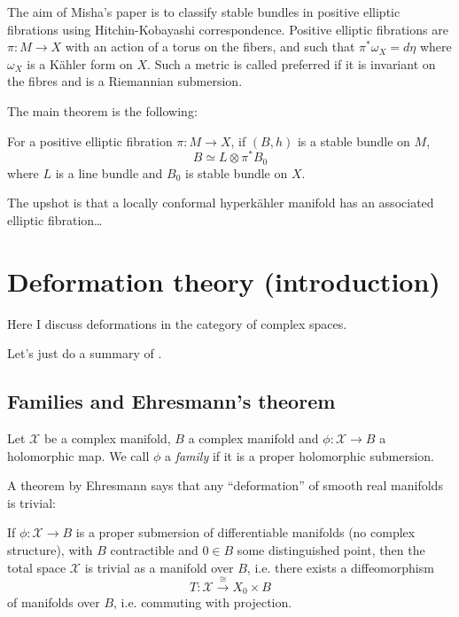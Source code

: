 \noindent
The aim of Misha's paper is to
classify stable bundles in positive elliptic
fibrations using Hitchin-Kobayashi
correspondence. Positive elliptic fibrations
are $\pi:M \to X$ with an action of a torus
on the fibers, and such that
$\pi^*\omega_X=d\eta$ where $\omega_X$ is a
Kähler form on $X$. Such a metric is called
preferred if it is invariant on the fibres
and is a Riemannian submersion.

The main theorem is the following:

\begin{theorem}
\label{theorem-stability-misha}
For a positive elliptic fibration $\pi:M \to
X$,
if $(B,h)$ is a stable bundle on $M$,
$$
B \simeq L \otimes \pi^*B_0
$$
where $L$ is a line bundle and
$B_0$ is stable bundle on $X$.
\end{theorem}

\noindent
The upshot is that a locally conformal
hyperkähler manifold
has an associated elliptic fibration…


\section{Deformation theory (introduction)}
\label{section-deformations}

\noindent
Here I discuss deformations in the category
of complex spaces.

Let's just do a summary of \cite[Chapter
9]{Voisin}.

\subsection{Families and Ehresmann's theorem}
\label{subsection-ehresmann}

Let $\mathcal{X}$ be a complex manifold, $B$
a complex manifold
and $\phi:\mathcal{X} \to B$ a holomorphic
map.
We call $\phi$ a {\it family} if it is a
proper holomorphic submersion.

A theorem by Ehresmann says that any
``deformation'' of
smooth real manifolds is trivial:

\begin{theorem}[Ehresmann]
\label{theorem-ehresmann}
\begin{reference}
\cite[Theorem 9.3]{voi}
\end{reference}
If $\phi:\mathcal{X} \to B$ is a
proper submersion of differentiable manifolds
(no complex structure), with $B$ contractible
and $0 \in B$
some distinguished point,
then the total space $\mathcal{X}$ is trivial
as a
manifold over $B$, i.e.
there exists a diffeomorphism
 $$
T:\mathcal{X}\xrightarrow{\cong}X_0 \times B
$$
of manifolds over $B$, i.e. commuting with
projection.
\end{theorem}

